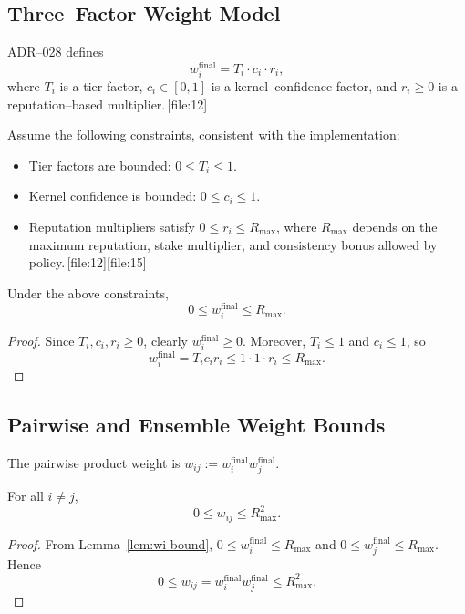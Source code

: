 \documentclass[11pt]{article}
\begin{document}
\subsection{Three--Factor Weight Model}

ADR--028 defines
\[
  w_i^{\mathrm{final}} = T_i \cdot c_i \cdot r_i,
\]
where \(T_i\) is a tier factor,
\(c_i \in [0,1]\) is a kernel--confidence factor,
and \(r_i \ge 0\) is a reputation--based multiplier.\,[file:12]

Assume the following constraints, consistent with the implementation:
\begin{itemize}[leftmargin=*]
  \item Tier factors are bounded: \(0 \le T_i \le 1\).
  \item Kernel confidence is bounded: \(0 \le c_i \le 1\).
  \item Reputation multipliers satisfy \(0 \le r_i \le R_{\max}\), where
  \(R_{\max}\) depends on the maximum reputation, stake multiplier, and
  consistency bonus allowed by policy.\,[file:12][file:15]
\end{itemize}

\begin{lemma}
\label{lem:wi-bound}
Under the above constraints,
\[
  0 \le w_i^{\mathrm{final}} \le R_{\max}.
\]
\end{lemma}

\begin{proof}
Since \(T_i, c_i, r_i \ge 0\), clearly \(w_i^{\mathrm{final}} \ge 0\).
Moreover, \(T_i \le 1\) and \(c_i \le 1\), so
\[
  w_i^{\mathrm{final}} = T_i c_i r_i \le 1 \cdot 1 \cdot r_i \le R_{\max}.
\]
\end{proof}

\subsection{Pairwise and Ensemble Weight Bounds}

The pairwise product weight is \(w_{ij} := w_i^{\mathrm{final}} w_j^{\mathrm{final}}\).

\begin{lemma}
For all \(i \ne j\),
\[
  0 \le w_{ij} \le R_{\max}^2.
\]
\end{lemma}

\begin{proof}
From Lemma~\ref{lem:wi-bound}, \(0 \le w_i^{\mathrm{final}} \le R_{\max}\) and
\(0 \le w_j^{\mathrm{final}} \le R_{\max}\). Hence
\[
  0 \le w_{ij} = w_i^{\mathrm{final}} w_j^{\mathrm{final}} \le R_{\max}^2.
\]
\end{proof}
\end{document}
